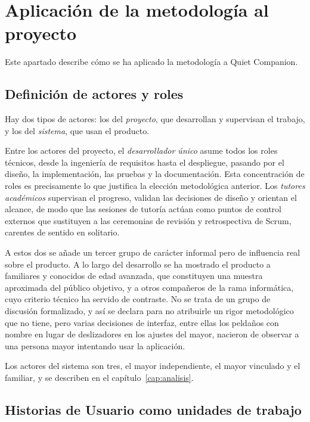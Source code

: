 \section{Aplicación de la metodología al proyecto}

Este apartado describe cómo se ha aplicado la metodología a Quiet Companion.

\subsection{Definición de actores y roles}

Hay dos tipos de actores: los del \textit{proyecto}, que desarrollan y supervisan el trabajo, y los del \textit{sistema}, que usan el producto.

Entre los actores del proyecto, el \textit{desarrollador único} asume todos los roles técnicos, desde la ingeniería de requisitos hasta el despliegue, pasando por el diseño, la implementación, las pruebas y la documentación. Esta concentración de roles es precisamente lo que justifica la elección metodológica anterior. Los \textit{tutores académicos} supervisan el progreso, validan las decisiones de diseño y orientan el alcance, de modo que las sesiones de tutoría actúan como puntos de control externos que sustituyen a las ceremonias de revisión y retrospectiva de Scrum, carentes de sentido en solitario.


A estos dos se añade un tercer grupo de carácter informal pero de influencia real sobre el producto. A lo largo del desarrollo se ha mostrado el producto a familiares y conocidos de edad avanzada, que constituyen una muestra aproximada del público objetivo, y a otros compañeros de la rama informática, cuyo criterio técnico ha servido de contraste. No se trata de un grupo de discusión formalizado, y así se declara para no atribuirle un rigor metodológico que no tiene, pero varias decisiones de interfaz, entre ellas los peldaños con nombre en lugar de deslizadores en los ajustes del mayor, nacieron de observar a una persona mayor intentando usar la aplicación.

Los actores del sistema son tres, el mayor independiente, el mayor vinculado y el familiar, y se describen en el capítulo~\ref{cap:analisis}.

\subsection{Historias de Usuario como unidades de trabajo}

